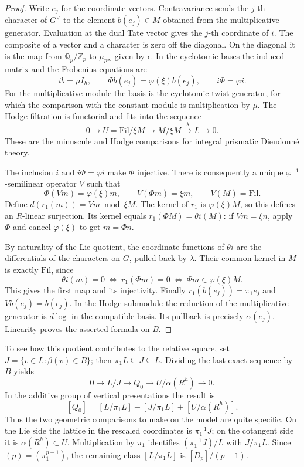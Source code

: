 \begin{proof}
Write \(e_j\) for the coordinate vectors. Contravariance sends the \(j\)-th character of \(G^\vee\) to the element \(b(e_j)\in M\) obtained from the multiplicative generator. Evaluation at the dual Tate vector gives the \(j\)-th coordinate of \(i\). The composite of a vector and a character is zero off the diagonal. On the diagonal it is the map from \(\mathbb Q_p/\mathbb Z_p\) to \(\mu_{p^\infty}\) given by \(\epsilon\). In the cyclotomic bases the induced matrix and the Frobenius equations are
\[
  ib=\mu I_h,\qquad \Phi b(e_j)=\varphi(\xi)b(e_j),
                       \qquad i\Phi=\varphi i .
\]
For the multiplicative module the basis is the cyclotomic twist generator, for which the comparison with the constant module is multiplication by \(\mu\). The Hodge filtration is functorial and fits into the sequence
\[
 0\longrightarrow U=\mathrm{Fil}/\xi M\longrightarrow M/\xi M
                         \xrightarrow{\lambda}L\longrightarrow0 .
\]
These are the minuscule and Hodge comparisons for integral prismatic Dieudonn\'e theory. \cite{prismatic-flag}

The inclusion \(i\) and \(i\Phi=\varphi i\) make \(\Phi\) injective. There is consequently a unique \(\varphi^{-1}\)-semilinear operator \(V\) such that
\[
 \Phi(Vm)=\varphi(\xi)m,\qquad V(\Phi m)=\xi m,\qquad V(M)=\mathrm{Fil}.
\]
Define \(d(r_1(m))=Vm\bmod\xi M\). The kernel of \(r_1\) is \(\varphi(\xi)M\), so this defines an \(R\)-linear surjection. Its kernel equals \(r_1(\Phi M)=\theta i(M)\): if \(Vm=\xi n\), apply \(\Phi\) and cancel \(\varphi(\xi)\) to get \(m=\Phi n\). 

By naturality of the Lie quotient, the coordinate functions of \(\theta i\) are the differentials of the characters on \(G\), pulled back by \(\lambda\). Their common kernel in \(M\) is exactly \(\mathrm{Fil}\), since
\[
 \theta i(m)=0\ \Longleftrightarrow\ r_1(\Phi m)=0
        \ \Longleftrightarrow\ \Phi m\in\varphi(\xi)M .
\]
This gives the first map and its injectivity. Finally \(r_1(b(e_j))=\pi_1 e_j\) and \(Vb(e_j)=b(e_j)\). In the Hodge submodule the reduction of the multiplicative generator is \(d\log\) in the compatible basis. Its pullback is precisely \(\alpha(e_j)\). Linearity proves the asserted formula on \(B\).
\end{proof}

To see how this quotient contributes to the relative square, set \(J=\{v\in L:\beta(v)\in B\}\); then \(\pi_1L\subseteq J\subseteq L\). Dividing the last exact sequence by \(B\) yields
\[
 0\longrightarrow L/J\longrightarrow Q_0
          \longrightarrow U/\alpha(R^h)\longrightarrow0 .
\]
In the additive group of vertical presentations the result is
\[
 [Q_0]=[L/\pi_1L]-[J/\pi_1L]+[U/\alpha(R^h)] .
\]
Thus the two geometric comparisons to make on the model are quite specific. On the Lie side the lattice in the rescaled coordinates is \(\pi_1^{-1}J\); on the cotangent side it is \(\alpha(R^h)\subset U\). Multiplication by \(\pi_1\) identifies \((\pi_1^{-1}J)/L\) with \(J/\pi_1L\). Since \((p)=(\pi_1^{p-1})\), the remaining class \([L/\pi_1L]\) is \([D_p]/(p-1)\).


